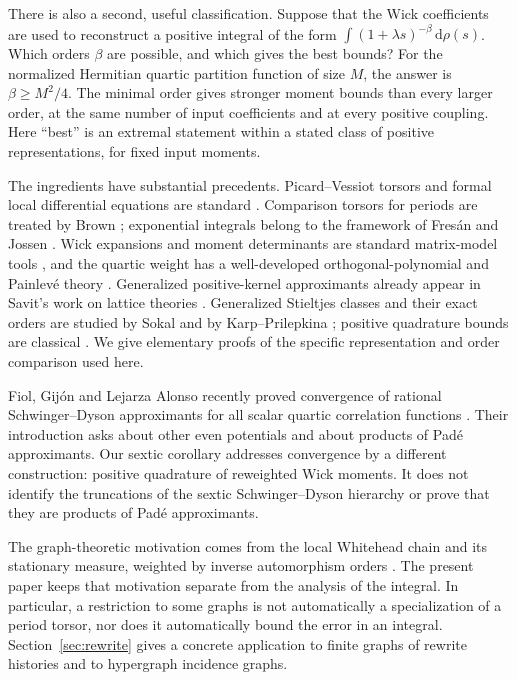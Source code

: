 \documentclass[11pt]{article}
\theoremstyle{definition}
\newcommand{\dd}{\,\mathrm d}
\numberwithin{equation}{section}
\begin{document}
There is also a second, useful classification. Suppose that the Wick
coefficients are used to reconstruct a positive integral of the form
$\int(1+\lambda s)^{-\beta}\dd\rho(s)$. Which orders $\beta$ are possible,
and which gives the best bounds? For the normalized Hermitian quartic
partition function of size $M$, the answer is $\beta\ge M^2/4$.
The minimal order gives stronger moment bounds than every larger order,
at the same number of input coefficients and at every positive coupling.
Here ``best'' is an extremal statement within a stated class of positive
representations, for fixed input moments.

The ingredients have substantial precedents. Picard--Vessiot torsors and
formal local differential equations are standard \cite{Singer}.
Comparison torsors for periods are treated by Brown \cite{Brown};
exponential integrals belong to the framework of Fres\'an and Jossen
\cite{FresanJossen}. Wick expansions and moment determinants are standard
matrix-model tools \cite{EKR}, and the quartic weight has a well-developed
orthogonal-polynomial and Painlev\'e theory \cite{ClarksonJordaan}.
Generalized positive-kernel approximants already appear in Savit's
work on lattice theories \cite[Appendix B]{Savit}.
Generalized Stieltjes classes and their exact orders are studied by Sokal
and by Karp--Prilepkina \cite{Sokal,KarpPrilepkina}; positive quadrature
bounds are classical \cite{Gautschi,LRW}. We give elementary proofs of the
specific representation and order comparison used here.

Fiol, Gij\'on and Lejarza Alonso recently proved convergence of rational
Schwinger--Dyson approximants for all scalar quartic correlation functions
\cite{FGL}. Their introduction asks about other even potentials and about
products of Pad\'e approximants. Our sextic corollary addresses convergence
by a different construction: positive quadrature of reweighted Wick
moments. It does not identify the truncations of the sextic
Schwinger--Dyson hierarchy or prove that they are products of Pad\'e
approximants.

The graph-theoretic motivation comes from the local Whitehead chain and
its stationary measure, weighted by inverse automorphism orders \cite{Kolpakov}.
The present paper keeps that motivation separate from the analysis of
the integral. In particular, a restriction to some graphs is not
automatically a specialization of a period torsor, nor does it automatically
bound the error in an integral.
Section~\ref{sec:rewrite} gives a concrete application to finite graphs
of rewrite histories and to hypergraph incidence graphs.
\end{document}
